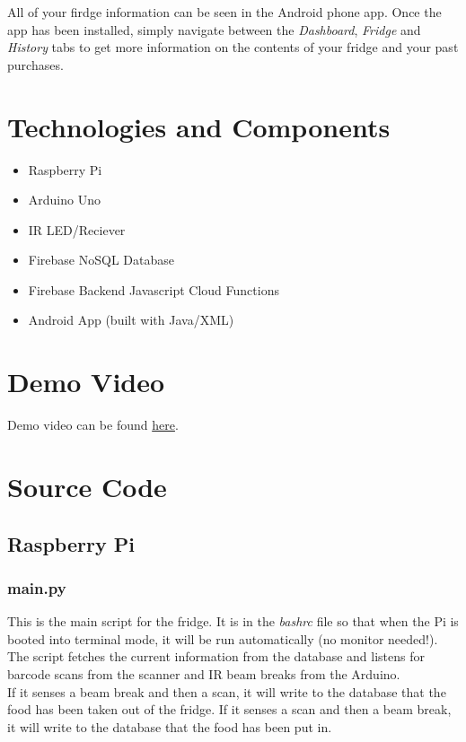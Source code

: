 All of your firdge information can be seen in the Android phone app. Once the app has been installed, simply navigate between
    the \textit{Dashboard}, \textit{Fridge} and \textit{History} tabs to get more information on the contents of your fridge
    and your past purchases.
\section{Technologies and Components}

\begin{itemize}
	\item Raspberry Pi
	\item Arduino Uno
    \item IR LED/Reciever
	\item Firebase NoSQL Database
    \item Firebase Backend Javascript Cloud Functions
	\item Android App (built with Java/XML)
\end{itemize}

\section{Demo Video}

Demo video can be found \href{https://youtu.be/m8oFfEKpmIg}{here}.

\section{Source Code}
\label{sec:code}

\subsection{Raspberry Pi}

\subsubsection{main.py}

This is the main script for the fridge. It is in the \textit{bashrc} file so that when the Pi is booted into terminal mode, 
    it will be run automatically (no monitor needed!). The script fetches the current information from the database and listens for
    barcode scans from the scanner and IR beam breaks from the Arduino.\\

If it senses a beam break and then a scan, it will write to the database that the food has been taken out of the fridge. 
    If it senses a scan and then a beam break, it will write to the database that the food has been put in.

